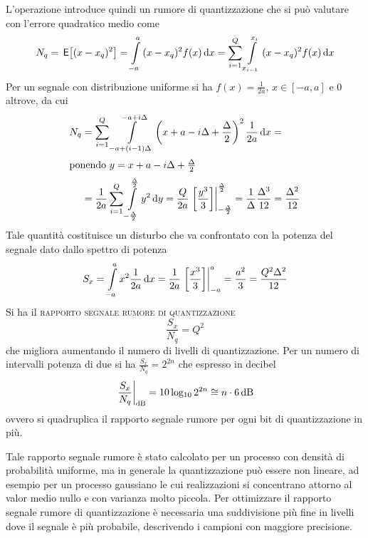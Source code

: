 L'operazione introduce quindi un rumore di quantizzazione che si può valutare con l'errore quadratico medio come
\[N_q=\E{(x-x_q)^2}=\intd{-a}{a}{(x-x_q)^2 f(x)}{x}=\sum_{i=1}^{Q}\intd{x_{i-1}}{x_i}{(x-x_q)^2 f(x)}{x}\]
Per un segnale con distribuzione uniforme si ha $f(x)=\frac{1}{2a},\,x\in[-a,a]$ e 0 altrove, da cui
\[\begin{split}N_q&=\sum_{i=1}^{Q}\intd{-a+(i-1)\Delta}{-a+i\Delta}{\left(x+a-i\Delta+\frac{\Delta}{2}\right)^2 \frac{1}{2a}}{x}=\\\intertext{ponendo $y=x+a-i\Delta+\frac{\Delta}{2}$}&=\frac{1}{2a}\sum_{i=1}^{Q}\intd{-\frac{\Delta}{2}}{\frac{\Delta}{2}}{y^2}{y}=\frac{Q}{2a}\bound{-\frac{\Delta}{2}}{\frac{\Delta}{2}}{\frac{y^3}{3}}=\frac{1}{\Delta}\frac{\Delta^3}{12}=\frac{\Delta^2}{12}
\end{split}\]
Tale quantità costituisce un disturbo che va confrontato con la potenza del segnale dato dallo spettro di potenza
\[S_x=\intd{-a}{a}{x^2\frac{1}{2a}}{x}=\frac{1}{2a}\bound{-a}{a}{\frac{x^3}{3}}=\frac{a^2}{3}=\frac{Q^2\Delta^2}{12}\]
Si ha il \textsc{rapporto segnale rumore di quantizzazione}
\begin{equation}
\frac{S_x}{N_q}=Q^2
\end{equation}
che migliora aumentando il numero di livelli di quantizzazione.
Per un numero di intervalli potenza di due si ha $\frac{S_x}{N_q}=2^{2n}$ che espresso in decibel \[\restrict{\frac{S_x}{N_q}}{\text{dB}}=10\Log 2^{2n}\cong n\cdot\SI{6}{\decibel}\]
ovvero si quadruplica il rapporto segnale rumore per ogni bit di quantizzazione in più.

Tale rapporto segnale rumore è stato calcolato per un processo con densità di probabilità uniforme, ma in generale la quantizzazione può essere non lineare, ad esempio per un processo gaussiano le cui realizzazioni si concentrano attorno al valor medio nullo e con varianza molto piccola. Per ottimizzare il rapporto segnale rumore di quantizzazione è necessaria una suddivisione più fine in livelli dove il segnale è più probabile, descrivendo i campioni con maggiore precisione.

